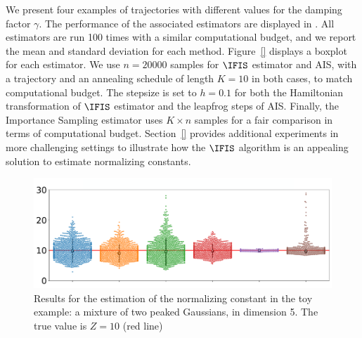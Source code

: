 We present four examples of trajectories with different values for the damping factor $\gamma$. The performance of the associated estimators are displayed in . %
All estimators are run 100 times with a similar computational budget, and we report the mean and standard deviation for each method. Figure~\ref{} displays a boxplot for each estimator.
We use $n = 20000$ samples for $\IFIS$ estimator and AIS, with a trajectory and an annealing schedule of length $K=10$ in both cases, to match computational budget. The stepsize is set to $h= 0.1$ for both the Hamiltonian transformation of $\IFIS$ estimator and the leapfrog steps of AIS. 
Finally, the Importance Sampling estimator uses $K\times n$ samples for a fair comparison in terms of computational budget. Section~\ref{} provides additional experiments in more challenging settings to illustrate how the $\IFIS$ algorithm is an appealing solution to estimate normalizing constants.
\begin{figure}
    \centering
    \includegraphics[width= \linewidth]{pics/boxplot_two_gaussian_dim_5.pdf}
    \caption{Results for the estimation of the normalizing constant in the toy example:  a mixture of two peaked Gaussians, in dimension 5. The true value is $Z=10$ (red line)}
    \label{fig:simple_gauss}
\end{figure}

